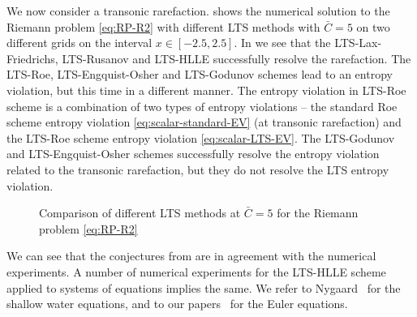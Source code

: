 We now consider a transonic rarefaction.  shows the numerical solution to the Riemann problem \eqref{eq:RP-R2} with different LTS methods with $ \bar{C}=5 $ on two different grids on the interval $ x \in [-2.5,2.5] $. In  we see that the LTS-Lax-Friedrichs, LTS-Rusanov and LTS-HLLE successfully resolve the rarefaction. The LTS-Roe, LTS-Engquist-Osher and LTS-Godunov schemes lead to an entropy violation, but this time in a different manner. The entropy violation in LTS-Roe scheme is a combination of two types of entropy violations -- the standard Roe scheme entropy violation \eqref{eq:scalar-standard-EV} (at transonic rarefaction) and the LTS-Roe scheme entropy violation \eqref{eq:scalar-LTS-EV}. The LTS-Godunov and LTS-Engquist-Osher schemes successfully resolve the entropy violation related to the transonic rarefaction, but they do not resolve the LTS entropy violation.
\begin{figure}[h!]
	\centering	

	\hspace{0.005\textwidth}
	
	\captionsetup{justification=centering}
	
	\caption{Comparison of different LTS methods at $ \bar{C}=5 $ for the Riemann problem \eqref{eq:RP-R2}}
	\label{fig:R2}

\end{figure} 

We can see that the conjectures from  are in agreement with the numerical experiments. A number of numerical experiments for the LTS-HLLE scheme applied to systems of equations implies the same. We refer to Nygaard~\cite{nyg17} for the shallow water equations, and to our papers~\cite{cp2,jp2,jp3} for the Euler equations.
